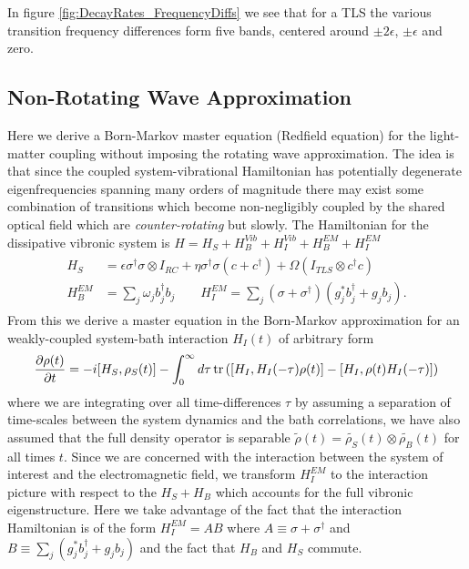 \documentclass[]{article}
\begin{document}
In figure \ref{fig:DecayRates_FrequencyDiffs} we see that for a TLS the various transition frequency differences form five bands, centered around $\pm2\epsilon$, $\pm\epsilon$ and zero.
\subsection{Non-Rotating Wave Approximation}
\label{ssec:nrwa}
Here we derive a Born-Markov master equation (Redfield equation) for the light-matter coupling without imposing the rotating wave approximation. The idea is that since the coupled system-vibrational Hamiltonian has potentially degenerate eigenfrequencies spanning many orders of magnitude there may exist some combination of transitions which become non-negligibly coupled by the shared optical field which are \textit{counter-rotating} but slowly. The Hamiltonian for the dissipative vibronic system is $H = H_S + H_B^{Vib} + H_I^{Vib} + H_B^{EM} + H_I^{EM}$
\begin{align}
\label{eq:H_nrwa}
	\begin{split}
		H_S &= \epsilon \sigma^{\dagger}\sigma\otimes I_{RC} + \eta\sigma^{\dagger}\sigma(c + c^{\dagger}) + \Omega ( I_{TLS}\otimes c^{\dagger}c) \\
		H_B^{EM} &= \sum_{j}\omega_j b^{\dagger}_j b_j \quad \quad H_I^{EM} = \sum_{j}(\sigma+\sigma^{\dagger})(g_j^*b^{\dagger}_j+ g_j b_j).
	\end{split}
\end{align}
From this we derive a master equation in the Born-Markov approximation for an weakly-coupled system-bath interaction $H_I(t)$ of arbitrary form
\begin{equation}
\pdv{\rho(t)}{t} = -i[H_S, \rho_S(t)] -\int_{0}^{\infty}d\tau\tr\left(\left[H_I, H_I(-\tau)\rho(t)\right] - \left[H_I, \rho(t)H_I(-\tau)\right]\right)
\end{equation}
where we are integrating over all time-differences $\tau$ by assuming a separation of time-scales between the system dynamics and the bath correlations, we have also assumed that the full density operator is separable $\tilde{\rho}(t) = \tilde{\rho_S}(t)\otimes\tilde{\rho_B}(t)$ for all times $t$. Since we are concerned with the interaction between the system of interest and the electromagnetic field, we transform $H_I^{EM}$ to the interaction picture with respect to the $H_S + H_B$ which accounts for the full vibronic eigenstructure. Here we take advantage of the fact that the interaction Hamiltonian is of the form $H_I^{EM}=AB$ where $A \equiv \sigma + \sigma^{\dagger}$ and $B\equiv \sum_{j}(g_j^*b^{\dagger}_j+ g_j b_j)$ and the fact that $H_B$ and $H_S$ commute.
\end{document}
